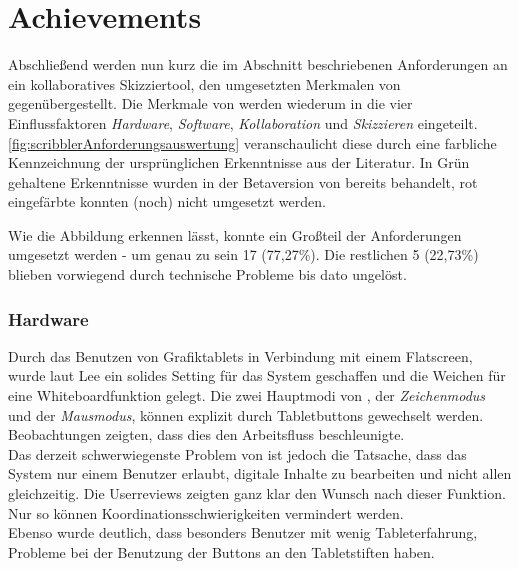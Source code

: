 \section{Achievements}
Abschließend werden nun kurz die im Abschnitt  beschriebenen Anforderungen an ein kollaboratives Skizziertool, den umgesetzten Merkmalen von \scribbler gegenübergestellt. Die Merkmale von \scribbler werden wiederum in die vier Einflussfaktoren \emph{Hardware}, \emph{Software}, \emph{Kollaboration} und \emph{Skizzieren} eingeteilt.  \autoref{fig:scribblerAnforderungsauswertung} veranschaulicht diese durch eine farbliche Kennzeichnung der ursprünglichen Erkenntnisse aus der Literatur. In Grün gehaltene Erkenntnisse wurden in der Betaversion von \scribbler bereits behandelt, rot eingefärbte konnten (noch) nicht umgesetzt werden.

\medskip Wie die Abbildung erkennen lässt, konnte ein Großteil der Anforderungen umgesetzt werden - um genau zu sein 17 (77,27\%). Die restlichen 5 (22,73\%) blieben vorwiegend durch technische Probleme bis dato ungelöst.

\subsubsection*{Hardware} 
Durch das Benutzen von Grafiktablets in Verbindung mit einem Flatscreen, wurde laut Lee ein solides Setting für das System geschaffen und die Weichen für eine Whiteboardfunktion gelegt. Die zwei Hauptmodi von \scribbler, der \emph{Zeichenmodus} und der \emph{Mausmodus}, können explizit durch Tabletbuttons gewechselt werden. Beobachtungen zeigten, dass dies den Arbeitsfluss beschleunigte.\\
Das derzeit schwerwiegenste Problem von \scribbler ist jedoch die Tatsache, dass das System nur einem Benutzer erlaubt, digitale Inhalte zu bearbeiten und nicht allen gleichzeitig. Die Userreviews zeigten ganz klar den Wunsch nach dieser Funktion. Nur so können Koordinationsschwierigkeiten vermindert werden. \\
Ebenso wurde deutlich, dass besonders Benutzer mit wenig Tableterfahrung, Probleme bei der Benutzung der Buttons an den Tabletstiften haben.

